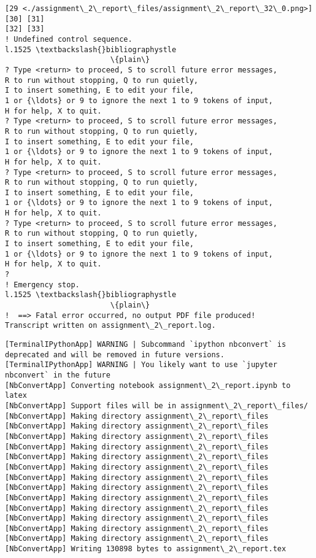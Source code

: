 \documentclass[11pt]{article}
\begin{document}
\begin{Verbatim}[commandchars=\\\{\}]
[29 <./assignment\_2\_report\_files/assignment\_2\_report\_32\_0.png>] [30] [31]
[32] [33]
! Undefined control sequence.
l.1525 \textbackslash{}bibliographystle
                        \{plain\}
? Type <return> to proceed, S to scroll future error messages,
R to run without stopping, Q to run quietly,
I to insert something, E to edit your file,
1 or {\ldots} or 9 to ignore the next 1 to 9 tokens of input,
H for help, X to quit.
? Type <return> to proceed, S to scroll future error messages,
R to run without stopping, Q to run quietly,
I to insert something, E to edit your file,
1 or {\ldots} or 9 to ignore the next 1 to 9 tokens of input,
H for help, X to quit.
? Type <return> to proceed, S to scroll future error messages,
R to run without stopping, Q to run quietly,
I to insert something, E to edit your file,
1 or {\ldots} or 9 to ignore the next 1 to 9 tokens of input,
H for help, X to quit.
? Type <return> to proceed, S to scroll future error messages,
R to run without stopping, Q to run quietly,
I to insert something, E to edit your file,
1 or {\ldots} or 9 to ignore the next 1 to 9 tokens of input,
H for help, X to quit.
? 
! Emergency stop.
l.1525 \textbackslash{}bibliographystle
                        \{plain\}
!  ==> Fatal error occurred, no output PDF file produced!
Transcript written on assignment\_2\_report.log.

    \end{Verbatim}

    \begin{Verbatim}[commandchars=\\\{\}]
[TerminalIPythonApp] WARNING | Subcommand `ipython nbconvert` is deprecated and will be removed in future versions.
[TerminalIPythonApp] WARNING | You likely want to use `jupyter nbconvert` in the future
[NbConvertApp] Converting notebook assignment\_2\_report.ipynb to latex
[NbConvertApp] Support files will be in assignment\_2\_report\_files/
[NbConvertApp] Making directory assignment\_2\_report\_files
[NbConvertApp] Making directory assignment\_2\_report\_files
[NbConvertApp] Making directory assignment\_2\_report\_files
[NbConvertApp] Making directory assignment\_2\_report\_files
[NbConvertApp] Making directory assignment\_2\_report\_files
[NbConvertApp] Making directory assignment\_2\_report\_files
[NbConvertApp] Making directory assignment\_2\_report\_files
[NbConvertApp] Making directory assignment\_2\_report\_files
[NbConvertApp] Making directory assignment\_2\_report\_files
[NbConvertApp] Making directory assignment\_2\_report\_files
[NbConvertApp] Making directory assignment\_2\_report\_files
[NbConvertApp] Making directory assignment\_2\_report\_files
[NbConvertApp] Making directory assignment\_2\_report\_files
[NbConvertApp] Writing 130898 bytes to assignment\_2\_report.tex

    \end{Verbatim}


    
    


    
    
\end{document}
